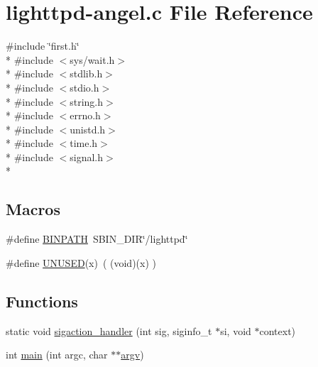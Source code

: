 \hypertarget{lighttpd-angel_8c}{\section{lighttpd-\/angel.c File Reference}
\label{lighttpd-angel_8c}
}
{\ttfamily \#include \char`\"{}first.\-h\char`\"{}}\\*
{\ttfamily \#include $<$sys/wait.\-h$>$}\\*
{\ttfamily \#include $<$stdlib.\-h$>$}\\*
{\ttfamily \#include $<$stdio.\-h$>$}\\*
{\ttfamily \#include $<$string.\-h$>$}\\*
{\ttfamily \#include $<$errno.\-h$>$}\\*
{\ttfamily \#include $<$unistd.\-h$>$}\\*
{\ttfamily \#include $<$time.\-h$>$}\\*
{\ttfamily \#include $<$signal.\-h$>$}\\*
\subsection*{Macros}
\begin{DoxyCompactItemize}
\item 
\#define \hyperlink{lighttpd-angel_8c_a23427a949693026cd5a2e76d6f5123d6}{B\-I\-N\-P\-A\-T\-H}~S\-B\-I\-N\-\_\-\-D\-I\-R\char`\"{}/lighttpd\char`\"{}
\item 
\#define \hyperlink{lighttpd-angel_8c_a86d500a34c624c2cae56bc25a31b12f3}{U\-N\-U\-S\-E\-D}(x)~( (void)(x) )
\end{DoxyCompactItemize}
\subsection*{Functions}
\begin{DoxyCompactItemize}
\item 
static void \hyperlink{lighttpd-angel_8c_a2a20974208b6a1ef316e2b916f18e93f}{sigaction\-\_\-handler} (int sig, siginfo\-\_\-t $\ast$si, void $\ast$context)
\item 
int \hyperlink{lighttpd-angel_8c_a3c04138a5bfe5d72780bb7e82a18e627}{main} (int argc, char $\ast$$\ast$\hyperlink{lemon_8c_af2efa898e9eed6fe6715279cb1ec35b0}{argv})
\end{DoxyCompactItemize}
